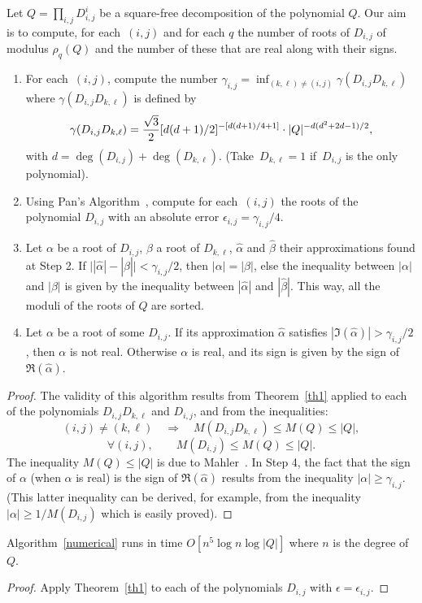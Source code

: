 \begin{alg}[Numerical] \label{numerical}
Let $Q=\prod_{i,j} D_{i,j}^i$ be a square-free decomposition of the
polynomial $Q$. Our aim
is to compute, for each~$(i,j)$ and for each $q$
the number of roots of $D_{i,j}$ of modulus $\rho_q(Q)$ and
the number of these that are real
along with their signs.
\begin{enumerate}
\item For each~$(i,j)$, compute the number $\gamma_{i,j}= \inf_{(k,\ell)
\not=(i,j)} \gamma(D_{i,j}D_{k,\ell})$ where $\gamma(D_{i,j}D_{k,\ell})$ is
defined by $$\gamma(D_{i,j}D_{k,\ell})={\sqrt{3} \over 2}
[d(d+1)/2]^{-[d(d+1)/4+1]}\cdot |Q|^{-d(d^2+2d-1)/2},$$
with $d=\deg(D_{i,j})+\deg(D_{k,\ell})$. (Take~$D_{k,\ell}=1$ if~$D_{i,j}$ is
the only polynomial).
\item Using Pan's Algorithm~\cite{Pan87}, compute for each~$(i,j)$ the roots of the polynomial $D_{i,j}$ with an absolute error
$\epsilon_{i,j} = \gamma_{i,j}/4$.
\item Let $\alpha$ be a root of $D_{i,j}$, $\beta$ a root of
$D_{k,\ell}$, $\hat{\alpha}$
and $\hat{\beta}$ their approximations found at Step 2. If
$\bigl||\hat{\alpha}|-|\hat{\beta}|\bigr|< \gamma_{i,j}/2$, then 
$|\alpha|=|\beta|$, else the inequality between $|\alpha|$ and $|\beta|$ is
given by the inequality between $|\hat{\alpha}|$ and $|\hat{\beta}|$. 
This way, all the moduli of the roots of $Q$ are sorted.
\item Let $\alpha$ be a root of some $D_{i,j}$. If its approximation
$\hat{\alpha}$ satisfies $|\Im(\hat{\alpha})| > \gamma_{i,j}/2$, then
$\alpha$ is not real. Otherwise $\alpha$ is real, and its sign is given
by the sign of $\Re({\hat{\alpha}})$.
\end{enumerate} 
\end{alg}
\begin{proof}
The validity of this algorithm results from Theorem~\ref{th1} applied to each
of the polynomials $D_{i,j}D_{k,\ell}$ and $D_{i,j}$, and from the inequalities:
$$(i,j)\not =(k,\ell)\quad\Longrightarrow\quad  M(D_{i,j}D_{k,\ell}) \leq M(Q) \leq |Q|,$$
$$\forall (i,j),\qquad M(D_{i,j}) \leq M(Q) \leq |Q|.$$ 
 The inequality $M(Q) \leq |Q|$ is due to Mahler~\cite{Mahler60}.
In Step 4, the fact that the sign of $\alpha$ (when $\alpha$ is real) is
the sign of $\Re(\hat{\alpha})$ results from the inequality 
$|\alpha| \geq \gamma_{i,j}$. (This latter inequality can be derived,
for example, from the inequality $|\alpha| \geq 1/ M(D_{i,j})$ which
is easily proved).
\end{proof}
\begin{property}\label{complexity}
Algorithm~\ref{numerical} runs in time $ O\left[ n^5 \log n  \log |Q|  \right]$
where $n$ is the degree of $Q$.
\end{property}
\begin{proof}
Apply Theorem~\ref{th1} to each of the polynomials $D_{i,j}$
with $\epsilon=\epsilon_{i,j}$.
\end{proof}

